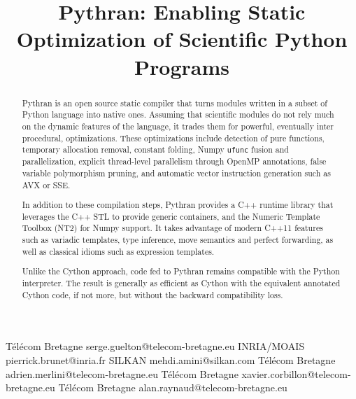 \documentclass[10pt, onecolumn, preprint]{sigplanconf}
\begin{document}
\title{Pythran: Enabling Static Optimization of Scientific Python Programs}

           {T{\'e}l{\'e}com Bretagne}
           {serge.guelton@telecom-bretagne.eu}
           {INRIA/MOAIS}
           {pierrick.brunet@inria.fr}
           {SILKAN}
           {mehdi.amini@silkan.com}
           {T{\'e}l{\'e}com Bretagne}
           {adrien.merlini@telecom-bretagne.eu}
           {T{\'e}l{\'e}com Bretagne}
           {xavier.corbillon@telecom-bretagne.eu}
           {T{\'e}l{\'e}com Bretagne}
           {alan.raynaud@telecom-bretagne.eu}

\maketitle

\begin{abstract}

    Pythran is an open source static compiler that turns modules written
    in a subset of Python language into native ones. Assuming that scientific
    modules do not rely much on the dynamic features of the language, it trades
    them for powerful, eventually inter procedural, optimizations.
    These optimizations include detection of pure functions, temporary
    allocation removal,
    constant folding, Numpy \texttt{ufunc} fusion and parallelization, explicit
    thread-level parallelism through OpenMP annotations, false variable
    polymorphism pruning, and automatic vector instruction generation such as
    AVX or SSE.

    In addition to these compilation steps, Pythran provides a C++ runtime 
    library that
    leverages the C++ STL to provide generic containers, and the Numeric 
    Template Toolbox (NT2) for Numpy support. It takes advantage of modern C++11
    features such as variadic templates, type inference, move semantics and
    perfect forwarding, as well as classical idioms such as expression templates.

    Unlike the Cython approach, code fed to Pythran remains compatible with the
    Python interpreter. The result is generally as efficient as Cython with
    the equivalent annotated Cython code, if not more, 
    but without the backward compatibility loss.


\end{abstract}
\end{document}
